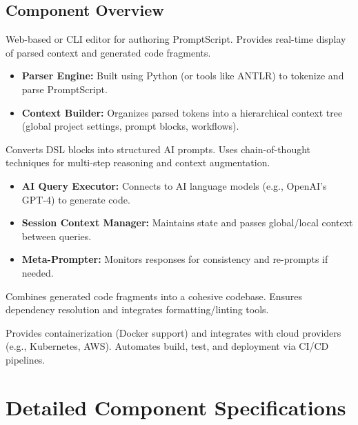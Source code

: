 \documentclass[11pt]{article}
\begin{document}
\subsection{Component Overview}
\begin{description}[leftmargin=1.5cm]
    \item[User Interface (UI):] Web-based or CLI editor for authoring PromptScript. Provides real-time display of parsed context and generated code fragments.
    \item[DSL Parser \& Context Builder:] 
    \begin{itemize}
        \item \textbf{Parser Engine:} Built using Python (or tools like ANTLR) to tokenize and parse PromptScript.
        \item \textbf{Context Builder:} Organizes parsed tokens into a hierarchical context tree (global project settings, prompt blocks, workflows).
    \end{itemize}
    \item[Intent Translator:] Converts DSL blocks into structured AI prompts. Uses chain-of-thought techniques for multi-step reasoning and context augmentation.
    \item[AI Compiler/Orchestrator:]
    \begin{itemize}
        \item \textbf{AI Query Executor:} Connects to AI language models (e.g., OpenAI’s GPT-4) to generate code.
        \item \textbf{Session Context Manager:} Maintains state and passes global/local context between queries.
        \item \textbf{Meta-Prompter:} Monitors responses for consistency and re-prompts if needed.
    \end{itemize}
    \item[Code Aggregator:] Combines generated code fragments into a cohesive codebase. Ensures dependency resolution and integrates formatting/linting tools.
    \item[Deployment Manager:] Provides containerization (Docker support) and integrates with cloud providers (e.g., Kubernetes, AWS). Automates build, test, and deployment via CI/CD pipelines.
\end{description}

\section{Detailed Component Specifications}
\end{document}

